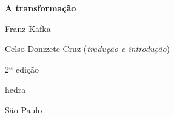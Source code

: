 




\begingroup\thispagestyle{empty}\vspace*{.05\textheight} 

              \formular
              \Huge
              \noindent
              \textbf{A transformação}
              \medskip  
              
              {\brabo\LARGE
              \noindent Franz Kafka}
              \vspace{3.5cm}

              \newfontfamily{}
              {\fontsize{30}{40}\selectfont \minion\small\noindent Celso Donizete Cruz (\textit{tradução e introdução})}

              \noindent
              {\fontsize{30}{40}\selectfont\minion\small\noindent 2ª edição}

              \vfill

              \newfontfamily{}
              {\noindent\fontsize{30}{40}\selectfont \timesnewroman hedra}

              \vspace{-0.5cm}
              {\selectfont\minion\small\noindent São Paulo \quad\the\year}

\endgroup
\pagebreak
